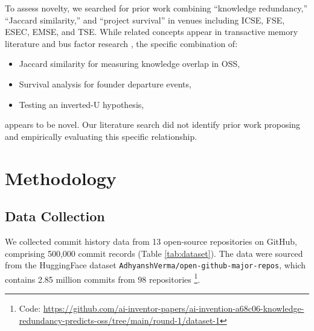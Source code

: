 \documentclass[11pt,letterpaper]{article}
\begin{document}
To assess novelty, we searched for prior work combining ``knowledge redundancy,'' ``Jaccard similarity,'' and ``project survival'' in venues including ICSE, FSE, ESEC, EMSE, and TSE. While related concepts appear in transactive memory literature \cite{Ren2011, Wegner1985} and bus factor research \cite{Avelino2019, Cosentino2015, Jabrayilzade2022}, the specific combination of:
\begin{itemize}
    \item Jaccard similarity for measuring knowledge overlap in OSS,
    \item Survival analysis for founder departure events,
    \item Testing an inverted-U hypothesis,
\end{itemize}
appears to be novel. Our literature search did not identify prior work proposing and empirically evaluating this specific relationship.

\section{Methodology}

\subsection{Data Collection}

We collected commit history data from 13 open-source repositories on GitHub, comprising 500,000 commit records (Table \ref{tab:dataset}). The data were sourced from the HuggingFace dataset \texttt{AdhyanshVerma/open-github-major-repos}, which contains 2.85 million commits from 98 repositories \footnote{Code: \url{https://github.com/ai-inventor-papers/ai-invention-a68c06-knowledge-redundancy-predicts-oss/tree/main/round-1/dataset-1}}.
\end{document}
